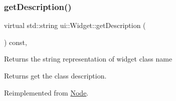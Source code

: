 \mbox{\label{classui_1_1Widget_a5955006f31a13706d69b4d261f2f98cd}} 
\subsubsection{\texorpdfstring{get\+Description()}{getDescription()}\hspace{0.1cm}{\footnotesize\ttfamily [2/2]}}
{\footnotesize\ttfamily virtual std\+::string ui\+::\+Widget\+::get\+Description (\begin{DoxyParamCaption}{ }\end{DoxyParamCaption}) const\hspace{0.3cm}{\ttfamily [override]}, {\ttfamily [virtual]}}

Returns the string representation of widget class name \begin{DoxyReturn}{Returns}
get the class description. 
\end{DoxyReturn}


Reimplemented from \hyperlink{classNode_a41710375a0d92a4ee54c39fe123b5912}{Node}.



